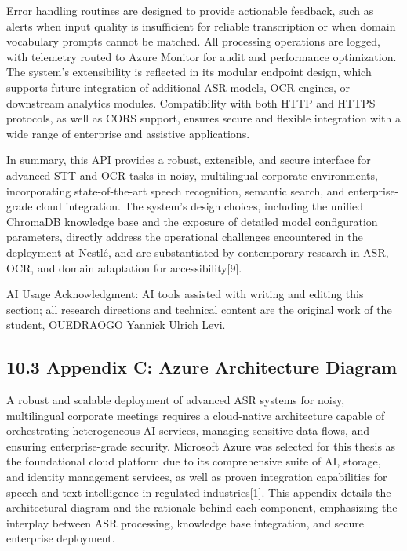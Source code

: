 \documentclass[12pt,a4paper]{article}
\begin{document}
Error handling routines are designed to provide actionable feedback, such as alerts when input quality is insufficient for reliable transcription or when domain vocabulary prompts cannot be matched. All processing operations are logged, with telemetry routed to Azure Monitor for audit and performance optimization. The system’s extensibility is reflected in its modular endpoint design, which supports future integration of additional ASR models, OCR engines, or downstream analytics modules. Compatibility with both HTTP and HTTPS protocols, as well as CORS support, ensures secure and flexible integration with a wide range of enterprise and assistive applications.


In summary, this API provides a robust, extensible, and secure interface for advanced STT and OCR tasks in noisy, multilingual corporate environments, incorporating state-of-the-art speech recognition, semantic search, and enterprise-grade cloud integration. The system’s design choices, including the unified ChromaDB knowledge base and the exposure of detailed model configuration parameters, directly address the operational challenges encountered in the deployment at Nestlé, and are substantiated by contemporary research in ASR, OCR, and domain adaptation for accessibility[9].


AI Usage Acknowledgment: AI tools assisted with writing and editing this section; all research directions and technical content are the original work of the student, OUEDRAOGO Yannick Ulrich Levi.


\subsection{10.3 Appendix C: Azure Architecture Diagram}


A robust and scalable deployment of advanced ASR systems for noisy, multilingual corporate meetings requires a cloud-native architecture capable of orchestrating heterogeneous AI services, managing sensitive data flows, and ensuring enterprise-grade security. Microsoft Azure was selected for this thesis as the foundational cloud platform due to its comprehensive suite of AI, storage, and identity management services, as well as proven integration capabilities for speech and text intelligence in regulated industries[1]. This appendix details the architectural diagram and the rationale behind each component, emphasizing the interplay between ASR processing, knowledge base integration, and secure enterprise deployment.
\end{document}
